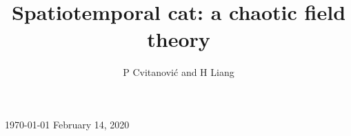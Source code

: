 \documentclass[12pt]{iopart}
\begin{document}
\title[Spatiotemporal cat]
{Spatiotemporal cat: a chaotic field theory} %

    \author{
P Cvitanovi{\'c}
         and
H Liang
    }\address{
Center for Nonlinear Science, School of Physics,
            Georgia Institute of Technology,
            Atlanta, GA 30332-0430, USA
    } 
    \vspace{10pt}
    \begin{indented}
    \item[]
    \ifboyscout\today\else
February 14, 2020
    \fi
    \end{indented}

    \begin{abstract}

    \end{abstract}



\submitto{\NL}
    \ifsubmission
\maketitle %
    \fi

\renewcommand{\statesp}{phase space}
\renewcommand{\Statesp}{Phase space}
\renewcommand{\stateDsp}{phase-space}
\renewcommand{\StateDsp}{Phase-space}


    \ifboyscout\clearpage\fi

    \ifboyscout\clearpage\fi


\renewcommand{\statesp}{state space}
\renewcommand{\Statesp}{State space}
\renewcommand{\stateDsp}{state-space}
\renewcommand{\StateDsp}{State-space}

    \ifboyscout\clearpage\fi

    \ifboyscout\clearpage\fi

    \ifboyscout\clearpage\fi

    \ifboyscout\clearpage\fi

\end{document}
